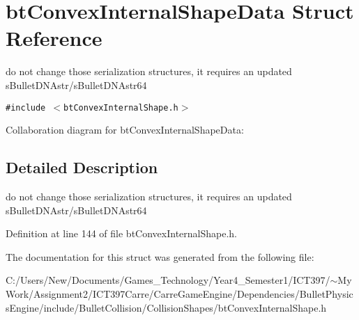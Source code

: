 \hypertarget{structbt_convex_internal_shape_data}{
\section{btConvexInternalShapeData Struct Reference}
\label{structbt_convex_internal_shape_data}
}
do not change those serialization structures, it requires an updated sBulletDNAstr/sBulletDNAstr64  


{\tt \#include $<$btConvexInternalShape.h$>$}

Collaboration diagram for btConvexInternalShapeData:

\subsection{Detailed Description}
do not change those serialization structures, it requires an updated sBulletDNAstr/sBulletDNAstr64 

Definition at line 144 of file btConvexInternalShape.h.

The documentation for this struct was generated from the following file:\begin{CompactItemize}
\item 
C:/Users/New/Documents/Games\_\-Technology/Year4\_\-Semester1/ICT397/$\sim$My Work/Assignment2/ICT397Carre/CarreGameEngine/Dependencies/BulletPhysicsEngine/include/BulletCollision/CollisionShapes/btConvexInternalShape.h\end{CompactItemize}
